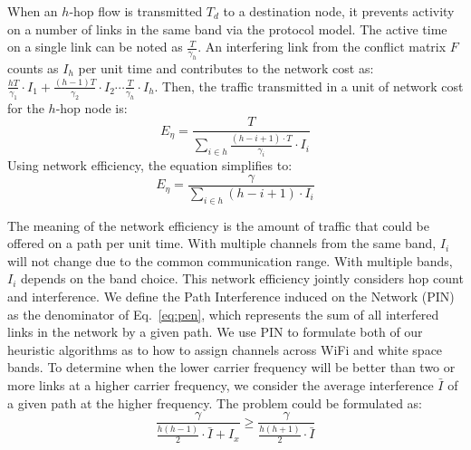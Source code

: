 When an $h$-hop flow is transmitted $T_d$ to a destination node, it prevents 
activity on a number of links in the same band via the protocol model. 
The active time on a single link can be noted as 
$\frac{T}{\gamma_h}$. 
An interfering link from the conflict matrix $F$ counts as $I_h$ per unit time
and contributes to the network cost as:
$\frac{hT}{\gamma_1}\cdot I_1 + \frac{(h-1)T}{\gamma_2}\cdot I_2 \cdots \frac{T}{\gamma_h}\cdot I_h$.
Then, the traffic transmitted in a unit of network cost for the $h$-hop node is:
\begin{equation}
\label{eq:originpen}
E_{\eta}=\frac{T}{\sum_{i \in h}\frac{(h-i+1)\cdot T}{\gamma_i}\cdot I_i }
\end{equation}
Using network efficiency, the equation simplifies to:
\begin{equation}
\label{eq:pen}
E_{\eta}=\frac{\gamma}{\sum_{i \in h} (h-i+1)\cdot I_i}
\end{equation}

The meaning of the network efficiency is the amount of traffic that could be 
offered on a path per unit time. With multiple channels from the same band,
$I_i$ will not change due to the common communication range. With multiple
bands, $I_i$ depends on the band choice.  
This network efficiency jointly considers hop count and interference. We define
the Path Interference induced on the Network (PIN) as the denominator of Eq.~\ref{eq:pen},
which represents the sum of all interfered links in the network by a given path. We
use PIN to formulate both of our heuristic algorithms as to how to assign channels
across WiFi and white space bands.
To determine when the lower carrier frequency will be better than two or more links at a
higher carrier frequency, we consider the average interference $\bar{I}$ of a given path
at the higher frequency.  The problem could be formulated as:
\begin{equation}
\label{eq:benefit}
\frac{\gamma}{\frac{h(h-1)}{2}\cdot \bar{I}+I_x} \geq \frac{\gamma}{\frac{h(h+1)}{2}\cdot \bar{I}}
\end{equation}

